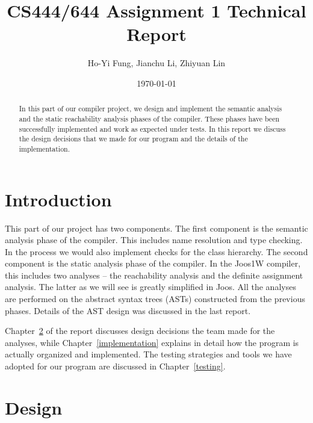 \documentclass[a4paper, notitlepage]{report}
\title{CS444/644 Assignment 1 Technical Report}
\author{Ho-Yi Fung, Jianchu Li, Zhiyuan Lin}
\date{\today}
\begin{document}
{\let\newpage\relax\maketitle}

\vspace{30pt}
\begin{abstract}
In this part of our compiler project, we design and implement the semantic analysis and the static reachability analysis phases of the compiler. These phases have been successfully implemented and work as expected under tests. In this report we discuss the design decisions that we made for our program and the details of the implementation.
\end{abstract}


\tableofcontents

\newpage

\chapter{Introduction}
This part of our project has two components. The first component is the semantic analysis phase of the compiler. This includes name resolution and type checking. In the process we would also implement checks for the class hierarchy. The second component is the static analysis phase of the compiler. In the Joos1W compiler, this includes two analyses -- the reachability analysis and the definite assignment analysis. The latter as we will see is greatly simplified in Joos.  All the analyses are performed on the abstract syntax trees (ASTs) constructed from the previous phases. Details of the AST design was discussed in the last report.

Chapter~\ref{design} of the report discusses design decisions the team made for the analyses, while Chapter~\ref{implementation} explains in detail how the program is actually organized and implemented. The testing strategies and tools we have adopted for our program are discussed in Chapter~\ref{testing}.


\chapter{Design}
\label{design}
\end{document}
